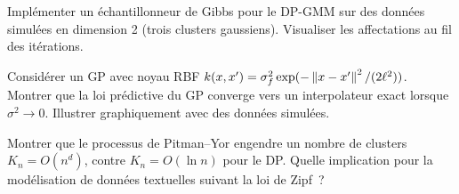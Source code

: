 \begin{exercice}
Impl\'ementer un \'echantillonneur de Gibbs pour le DP-GMM sur des donn\'ees
simul\'ees en dimension 2 (trois clusters gaussiens). Visualiser les
affectations au fil des it\'erations.
\end{exercice}

\begin{exercice}
Consid\'erer un GP avec noyau RBF $k(x,x') = \sigma_f^2 \exp(-\left\| x-x' \right\|^2/(2\ell^2))$.
Montrer que la loi pr\'edictive du GP converge vers un interpolateur exact
lorsque $\sigma^2 \to 0$. Illustrer graphiquement avec des donn\'ees simul\'ees.
\end{exercice}

\begin{exercice}
Montrer que le processus de Pitman--Yor engendre un nombre de clusters
$K_n = O(n^d)$, contre $K_n = O(\ln n)$ pour le DP. Quelle implication
pour la mod\'elisation de donn\'ees textuelles suivant la loi de Zipf~?
\end{exercice}
